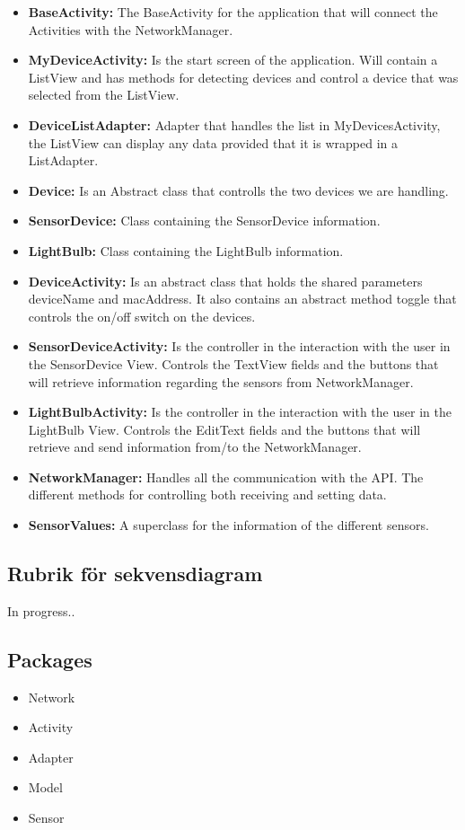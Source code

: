 \documentclass[a4paper]{article}
\begin{document}
\begin{itemize}
\item{\textbf{BaseActivity:}} 
The BaseActivity for the application that will connect the Activities with the NetworkManager.
\item{\textbf{MyDeviceActivity:}} 
Is the start screen of the application. Will contain a ListView and has methods for detecting devices and control a device that was selected from the ListView.
\item{\textbf{DeviceListAdapter:}} 
Adapter that handles the list in MyDevicesActivity, the ListView can display any data provided that it is wrapped in a ListAdapter. 
\item{\textbf{Device:}} 
Is an Abstract class that controlls the two devices we are handling. 
\item{\textbf{SensorDevice:}} 
Class containing the SensorDevice information.
\item{\textbf{LightBulb:}}
Class containing the LightBulb information.
\item{\textbf{DeviceActivity:}} 
Is an abstract class that holds the shared parameters deviceName and macAddress. It also contains an abstract method toggle that controls the on/off switch on the devices.
\item{\textbf{SensorDeviceActivity:}} 
Is the controller in the interaction with the user in the SensorDevice View. Controls the TextView fields and the buttons that will retrieve information regarding the sensors from NetworkManager.
\item{\textbf{LightBulbActivity:}} 
Is the controller in the interaction with the user in the LightBulb View. Controls the EditText fields and the buttons that will retrieve and send information from/to the NetworkManager.
 
\item{\textbf{NetworkManager:}} 
Handles all the communication with the API. The different methods for controlling both receiving and setting data.
\item{\textbf{SensorValues:}} 
A superclass for the information of the different sensors.

\end{itemize}

\subsection{Rubrik för sekvensdiagram}
In progress..
\subsection{Packages}
\begin{itemize}
\item Network
\item Activity
\item Adapter
\item Model
\item Sensor
\end{itemize}
\end{document}

